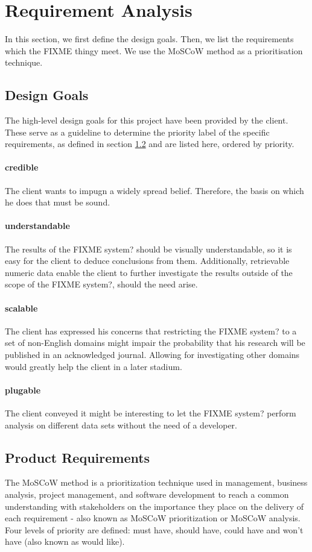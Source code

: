 \section {Requirement Analysis}
In this section, we first define the design goals. Then, we list the requirements which the {\color{red} FIXME thingy} meet. We use the MoSCoW method\cite{clegg1994case} as a prioritisation technique.

\subsection{Design Goals}
The high-level design goals for this project have been provided by the client. These serve as a guideline to determine the priority label of the specific requirements, as defined in section \ref{sec:reqs} and are listed here, ordered by priority.

\paragraph{credible} The client wants to impugn a widely spread belief. Therefore, the basis on which he does that must be sound.
\paragraph{understandable} The results of the {\color{red} FIXME system?} should be visually understandable, so it is easy for the client to deduce conclusions from them. Additionally, retrievable numeric data enable the client to further investigate the results outside of the scope of the {\color{red} FIXME system?}, should the need arise.
\paragraph{scalable} The client has expressed his concerns that restricting the {\color{red} FIXME system?} to a set of non-English domains might impair the probability that his research will be published in an acknowledged journal. Allowing for investigating other domains would greatly help the client in a later stadium.
\paragraph{plugable} The client conveyed it might be interesting to let the {\color{red} FIXME system?} perform analysis on different data sets without the need of a developer. 

\subsection{Product Requirements}\label{sec:reqs}
The MoSCoW method is a prioritization technique used in management, business analysis, project management, and software development to reach a common understanding with stakeholders on the importance they place on the delivery of each requirement - also known as MoSCoW prioritization or MoSCoW analysis. Four levels of priority are defined: must have, should have, could have and won't have (also known as would like).

